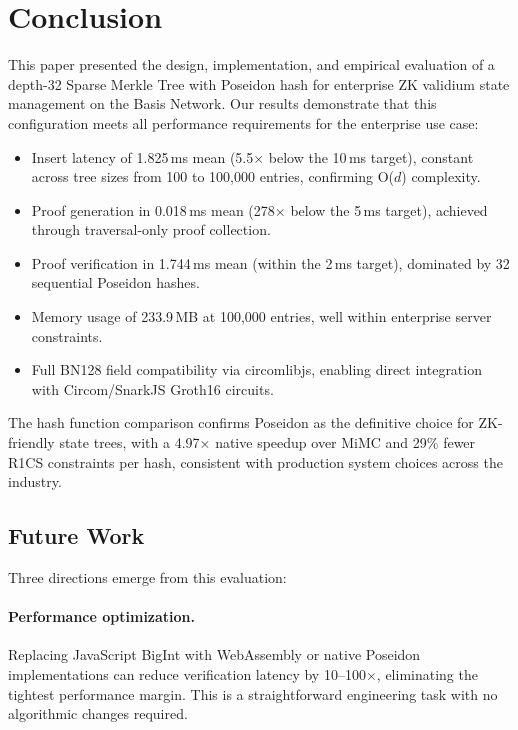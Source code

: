 
\section{Conclusion}
\label{sec:conclusion}

This paper presented the design, implementation, and empirical evaluation of a depth-32 Sparse Merkle Tree with Poseidon hash for enterprise ZK validium state management on the Basis Network. Our results demonstrate that this configuration meets all performance requirements for the enterprise use case:

\begin{itemize}
  \item Insert latency of 1.825\,ms mean (5.5$\times$ below the 10\,ms target), constant across tree sizes from 100 to 100{,}000 entries, confirming O($d$) complexity.
  \item Proof generation in 0.018\,ms mean (278$\times$ below the 5\,ms target), achieved through traversal-only proof collection.
  \item Proof verification in 1.744\,ms mean (within the 2\,ms target), dominated by 32 sequential Poseidon hashes.
  \item Memory usage of 233.9\,MB at 100{,}000 entries, well within enterprise server constraints.
  \item Full BN128 field compatibility via circomlibjs, enabling direct integration with Circom/SnarkJS Groth16 circuits.
\end{itemize}

The hash function comparison confirms Poseidon as the definitive choice for ZK-friendly state trees, with a 4.97$\times$ native speedup over MiMC and 29\% fewer R1CS constraints per hash, consistent with production system choices across the industry.

\subsection{Future Work}

Three directions emerge from this evaluation:

\paragraph{Performance optimization.} Replacing JavaScript BigInt with WebAssembly or native Poseidon implementations can reduce verification latency by 10--100$\times$, eliminating the tightest performance margin. This is a straightforward engineering task with no algorithmic changes required.

